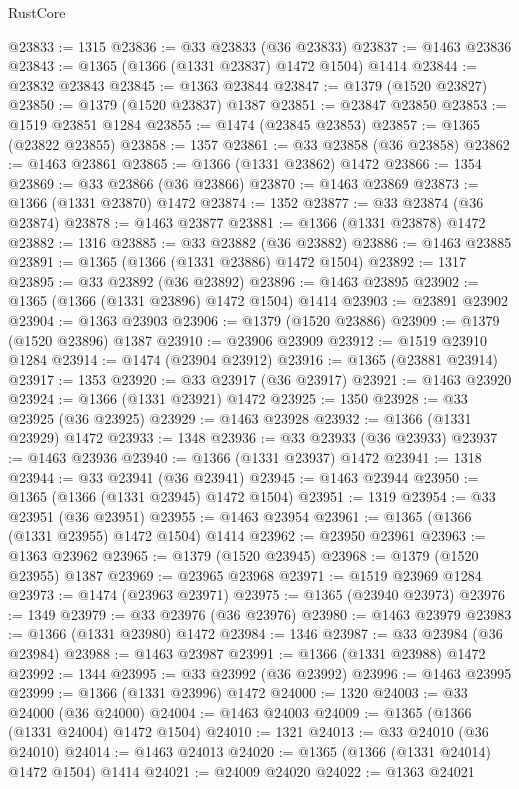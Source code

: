 \begin{lexlean}{RustCore}
\begin{coremodule}
@23833 := 1315
@23836 := @33 @23833 (@36 @23833)
@23837 := @1463 @23836
@23843 := @1365 (@1366 (@1331 @23837) @1472 @1504) @1414
@23844 := @23832 @23843
@23845 := @1363 @23844
@23847 := @1379 (@1520 @23827)
@23850 := @1379 (@1520 @23837) @1387
@23851 := @23847 @23850
@23853 := @1519 @23851 @1284
@23855 := @1474 (@23845 @23853)
@23857 := @1365 (@23822 @23855)
@23858 := 1357
@23861 := @33 @23858 (@36 @23858)
@23862 := @1463 @23861
@23865 := @1366 (@1331 @23862) @1472
@23866 := 1354
@23869 := @33 @23866 (@36 @23866)
@23870 := @1463 @23869
@23873 := @1366 (@1331 @23870) @1472
@23874 := 1352
@23877 := @33 @23874 (@36 @23874)
@23878 := @1463 @23877
@23881 := @1366 (@1331 @23878) @1472
@23882 := 1316
@23885 := @33 @23882 (@36 @23882)
@23886 := @1463 @23885
@23891 := @1365 (@1366 (@1331 @23886) @1472 @1504)
@23892 := 1317
@23895 := @33 @23892 (@36 @23892)
@23896 := @1463 @23895
@23902 := @1365 (@1366 (@1331 @23896) @1472 @1504) @1414
@23903 := @23891 @23902
@23904 := @1363 @23903
@23906 := @1379 (@1520 @23886)
@23909 := @1379 (@1520 @23896) @1387
@23910 := @23906 @23909
@23912 := @1519 @23910 @1284
@23914 := @1474 (@23904 @23912)
@23916 := @1365 (@23881 @23914)
@23917 := 1353
@23920 := @33 @23917 (@36 @23917)
@23921 := @1463 @23920
@23924 := @1366 (@1331 @23921) @1472
@23925 := 1350
@23928 := @33 @23925 (@36 @23925)
@23929 := @1463 @23928
@23932 := @1366 (@1331 @23929) @1472
@23933 := 1348
@23936 := @33 @23933 (@36 @23933)
@23937 := @1463 @23936
@23940 := @1366 (@1331 @23937) @1472
@23941 := 1318
@23944 := @33 @23941 (@36 @23941)
@23945 := @1463 @23944
@23950 := @1365 (@1366 (@1331 @23945) @1472 @1504)
@23951 := 1319
@23954 := @33 @23951 (@36 @23951)
@23955 := @1463 @23954
@23961 := @1365 (@1366 (@1331 @23955) @1472 @1504) @1414
@23962 := @23950 @23961
@23963 := @1363 @23962
@23965 := @1379 (@1520 @23945)
@23968 := @1379 (@1520 @23955) @1387
@23969 := @23965 @23968
@23971 := @1519 @23969 @1284
@23973 := @1474 (@23963 @23971)
@23975 := @1365 (@23940 @23973)
@23976 := 1349
@23979 := @33 @23976 (@36 @23976)
@23980 := @1463 @23979
@23983 := @1366 (@1331 @23980) @1472
@23984 := 1346
@23987 := @33 @23984 (@36 @23984)
@23988 := @1463 @23987
@23991 := @1366 (@1331 @23988) @1472
@23992 := 1344
@23995 := @33 @23992 (@36 @23992)
@23996 := @1463 @23995
@23999 := @1366 (@1331 @23996) @1472
@24000 := 1320
@24003 := @33 @24000 (@36 @24000)
@24004 := @1463 @24003
@24009 := @1365 (@1366 (@1331 @24004) @1472 @1504)
@24010 := 1321
@24013 := @33 @24010 (@36 @24010)
@24014 := @1463 @24013
@24020 := @1365 (@1366 (@1331 @24014) @1472 @1504) @1414
@24021 := @24009 @24020
@24022 := @1363 @24021

\end{coremodule}
\end{lexlean}
